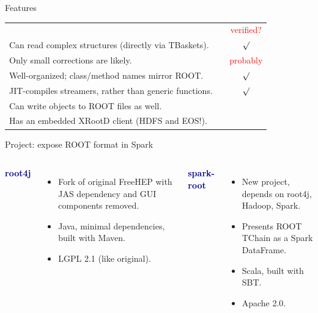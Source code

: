 \documentclass{beamer}
\begin{document}
\begin{frame}{Features}
\renewcommand{\arraystretch}{1.5}
\begin{tabular}{p{0.85\linewidth} c}
& \textcolor{red}{verified?} \\
Can read complex structures (directly via TBaskets). & \textcolor{red}{$\surd$} \\
Only small corrections are likely. & \textcolor{red}{probably} \\
Well-organized; class/method names mirror ROOT. & \textcolor{red}{$\surd$} \\
JIT-compiles streamers, rather than generic functions. & \textcolor{red}{$\surd$} \\
Can write objects to ROOT files as well. & \\
Has an embedded XRootD client (HDFS and EOS!). & \\
\end{tabular}
\end{frame}

\begin{frame}[fragile]{Project: expose ROOT format in Spark}
\vspace{0.5 cm}
\begin{columns}[t]
\textcolor{darkblue}{\large \bf root4j}

\vspace{0.1 cm}
\begin{itemize}
\item Fork of original FreeHEP with JAS dependency and GUI components removed.
\item Java, minimal dependencies, built with Maven.
\item LGPL 2.1 (like original).
\end{itemize}

\textcolor{darkblue}{\large \bf spark-root}

\vspace{0.1 cm}
\begin{itemize}
\item New project, depends on root4j, Hadoop, Spark.
\item Presents ROOT TChain as a Spark DataFrame.
\item Scala, built with SBT.
\item Apache 2.0.
\end{itemize}
\end{columns}
\end{frame}
\end{document}

